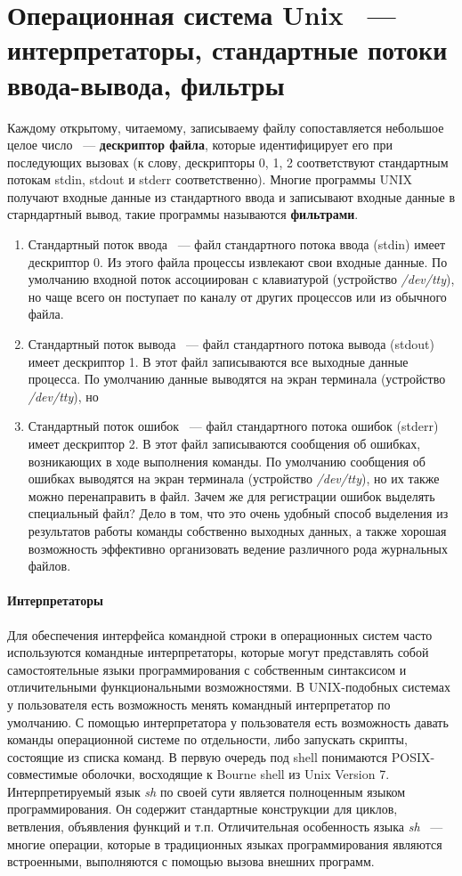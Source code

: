 \documentclass[10pt]{article}
\begin{document}
	\section{Операционная система Unix ~--- интерпретаторы, стандартные потоки ввода-вывода, фильтры}
	Каждому открытому, читаемому, записываему файлу сопоставляется небольшое целое число ~--- \textbf{дескриптор файла}, которые идентифицирует его при последующих вызовах (к слову, дескрипторы 0, 1, 2 соответствуют стандартным потокам stdin, stdout и stderr соответственно). Многие программы UNIX получают входные данные из стандартного ввода и записывают входные данные в старндартный вывод, такие программы называются \textbf{фильтрами}.
	\begin{enumerate}
		\item Стандартный поток ввода ~--- файл стандартного потока ввода (stdin) имеет дескриптор 0. Из этого файла процессы извлекают свои входные данные. По умолчанию входной поток ассоциирован с клавиатурой (устройство \textit{/dev/tty}), но чаще всего он поступает по каналу от других процессов или из обычного файла.
		\item Стандартный поток вывода ~--- файл стандартного потока вывода (stdout) имеет дескриптор 1. В этот файл записываются все выходные данные процесса. По умолчанию данные выводятся на экран терминала (устройство \textit{/dev/tty}), но 
		\item Стандартный поток ошибок ~--- файл стандартного потока ошибок (stderr) имеет дескриптор 2. В этот файл записываются сообщения об ошибках, возникающих в ходе выполнения команды. По умолчанию сообщения об ошибках выводятся на экран терминала (устройство \textit{/dev/tty}), но их также можно перенаправить в файл. Зачем же для регистрации ошибок выделять специальный файл?  Дело в том, что это очень удобный способ выделения из результатов работы команды собственно выходных данных, а также хорошая возможность эффективно организовать ведение различного рода журнальных файлов.
	\end{enumerate}
	\paragraph{Интерпретаторы}
	Для обеспечения интерфейса командной строки в операционных систем часто используются командные интерпретаторы, которые могут представлять собой самостоятельные языки программирования с собственным синтаксисом и отличительными функциональными возможностями.
	В UNIX-подобных системах у пользователя есть возможность менять командный интерпретатор по умолчанию.
	С помощью интерпретатора у пользователя есть возможность давать команды операционной системе по отдельности, либо запускать скрипты, состоящие из списка команд. В первую очередь под shell понимаются POSIX-совместимые оболочки, восходящие к Bourne shell из Unix Version 7.
	Интерпретируемый язык \textit{sh} по своей сути является полноценным языком программирования. Он содержит стандартные конструкции для циклов, ветвления, объявления функций и т.п. Отличительная особенность языка \textit{sh} ~--- многие операции, которые в традиционных языках программирования являются встроенными, выполняются с помощью вызова внешних программ.
\end{document}
